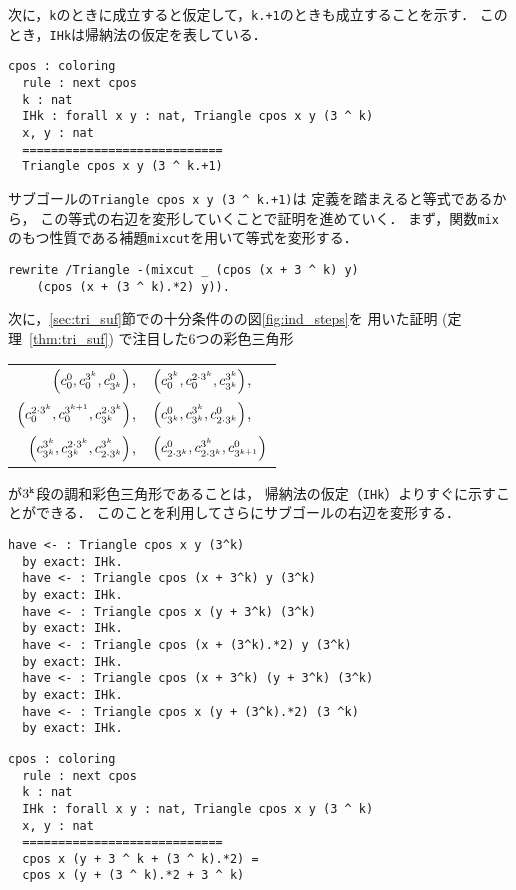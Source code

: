 次に，{\tt{k}}のときに成立すると仮定して，{\tt{k.+1}}のときも成立することを示す．
このとき，{\tt{IHk}}は帰納法の仮定を表している．
\begin{lstlisting}[language=Coq]
  cpos : coloring
  rule : next cpos
  k : nat
  IHk : forall x y : nat, Triangle cpos x y (3 ^ k)
  x, y : nat
  ============================
  Triangle cpos x y (3 ^ k.+1)
\end{lstlisting}
サブゴールの{\tt{Triangle cpos x y (3 \verb|^| k.+1)}}は
定義を踏まえると等式であるから，
この等式の右辺を変形していくことで証明を進めていく．
まず，関数{\tt{mix}}のもつ性質である補題{\tt{mixcut}}を用いて等式を変形する．
\begin{lstlisting}[language=Coq]
  rewrite /Triangle -(mixcut _ (cpos (x + 3 ^ k) y)
    (cpos (x + (3 ^ k).*2) y)).
\end{lstlisting}
次に，\ref{sec:tri_suf}節での十分条件のの図\ref{fig:ind_steps}を
用いた証明 (定理~\ref{thm:tri_suf}) で注目した6つの彩色三角形
\begin{center}
  \begin{tabular}{rl}
    $\left(c^{0}_{0},c^{3^{k}}_{0},c^{0}_{3^{k}}\right)$,
    &
    $\left(c^{3^{k}}_{0},c^{2\cdot3^{k}}_{0},c^{3^{k}}_{3^{k}}\right)$,
    \\
    $\left(c^{2\cdot3^{k}}_{0},c^{3^{k+1}}_{0},c^{2\cdot3^{k}}_{3^{k}}\right)$,
    &
    $\left(c^{0}_{3^{k}},c^{3^{k}}_{3^{k}},c^{0}_{2\cdot3^{k}}\right)$,
    \\
    $\left(c^{3^{k}}_{3^{k}},c^{2\cdot3^{k}}_{3^{k}},c^{3^{k}}_{2\cdot3^{k}}\right)$,
    &
    $\left(c^{0}_{2\cdot3^{k}},c^{3^{k}}_{2\cdot3^{k}},c^{0}_{3^{k+1}}\right)$
  \end{tabular}
\end{center}
が$3^{\tt{k}}$段の調和彩色三角形であることは，
帰納法の仮定（{\tt{IHk}}）よりすぐに示すことができる．
このことを利用してさらにサブゴールの右辺を変形する．
\begin{lstlisting}[language=Coq]
  have <- : Triangle cpos x y (3^k)
  by exact: IHk.
  have <- : Triangle cpos (x + 3^k) y (3^k)
  by exact: IHk.
  have <- : Triangle cpos x (y + 3^k) (3^k)
  by exact: IHk.
  have <- : Triangle cpos (x + (3^k).*2) y (3^k)
  by exact: IHk.
  have <- : Triangle cpos (x + 3^k) (y + 3^k) (3^k)
  by exact: IHk. 
  have <- : Triangle cpos x (y + (3^k).*2) (3 ^k)
  by exact: IHk.
\end{lstlisting}
\begin{lstlisting}[language=Coq]
  cpos : coloring
  rule : next cpos
  k : nat
  IHk : forall x y : nat, Triangle cpos x y (3 ^ k)
  x, y : nat
  ============================
  cpos x (y + 3 ^ k + (3 ^ k).*2) =
  cpos x (y + (3 ^ k).*2 + 3 ^ k)
\end{lstlisting}
